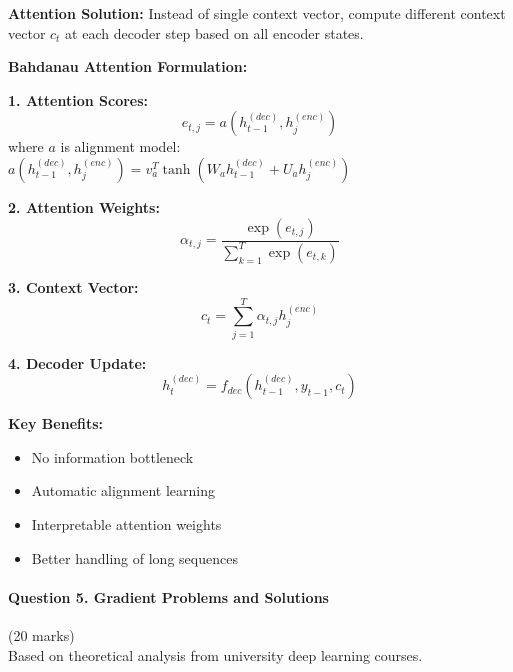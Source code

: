 \documentclass[12pt]{article}
\begin{document}
\begin{enumerate}[(a)]
{    \textbf{Attention Solution:}
    Instead of single context vector, compute different context vector $c_t$ at each decoder step based on all encoder states.
    
    \textbf{Bahdanau Attention Formulation:}
    
    \textbf{1. Attention Scores:}
    $$e_{t,j} = a(h_{t-1}^{(dec)}, h_j^{(enc)})$$
    where $a$ is alignment model: $a(h_{t-1}^{(dec)}, h_j^{(enc)}) = v_a^T \tanh(W_a h_{t-1}^{(dec)} + U_a h_j^{(enc)})$
    
    \textbf{2. Attention Weights:}
    $$\alpha_{t,j} = \frac{\exp(e_{t,j})}{\sum_{k=1}^T \exp(e_{t,k})}$$
    
    \textbf{3. Context Vector:}
    $$c_t = \sum_{j=1}^T \alpha_{t,j} h_j^{(enc)}$$
    
    \textbf{4. Decoder Update:}
    $$h_t^{(dec)} = f_{dec}(h_{t-1}^{(dec)}, y_{t-1}, c_t)$$
    
    \textbf{Key Benefits:}
    \begin{itemize}
        \item No information bottleneck
        \item Automatic alignment learning
        \item Interpretable attention weights
        \item Better handling of long sequences
    \end{itemize}
    }
\end{enumerate}

\newpage
\paragraph{Question 5. Gradient Problems and Solutions}\hfill (20 marks)\\
Based on theoretical analysis from university deep learning courses.
\end{document}
